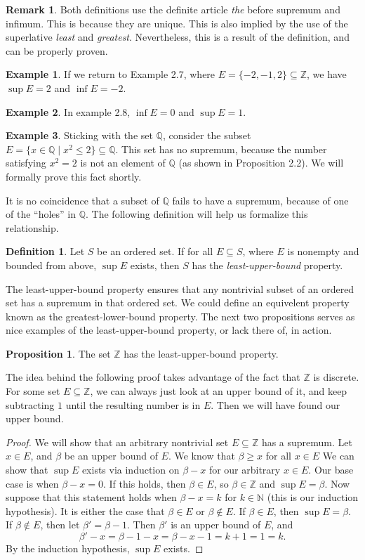 \documentclass{article}
\newcommand{\N}{\mathbb{N}}
\newcommand{\Q}{\mathbb{Q}}
\newcommand{\Z}{\mathbb{Z}}
\theoremstyle{definition}
\newtheorem{proposition}{Proposition}[section]
\newtheorem{definition}{Definition}[section]
\newtheorem{example}{Example}[section]
\newtheorem{remark}{Remark}[section]
\begin{document}
\begin{remark}
	Both definitions use the definite article \textit{the} before supremum and infimum. This is because they are unique. This is also implied by the use of the superlative \textit{least} and \textit{greatest}. Nevertheless, this is a result of the definition, and can be properly proven. 
\end{remark}

\begin{example}
	If we return to Example 2.7, where $ E=\{-2,-1,2\}\subseteq\Z $, we have $ \sup E=2 $ and $ \inf E=-2 $. 
\end{example}
\begin{example}
	In example 2.8, $ \inf E=0 $ and $ \sup E=1 $.
\end{example}
\begin{example}
	Sticking with the set $ \Q$, consider the subset $ E=\{x\in\Q\mid x^2\le 2\}\subseteq \Q $. This set has no supremum, because the number satisfying $ x^2=2 $ is not an element of $ \Q $ (as shown in Proposition 2.2). We will formally prove this fact shortly. 
\end{example}
It is no coincidence that a subset of $ \Q $ fails to have a supremum, because of one of the ``holes'' in $ \Q $. The following definition will help us formalize this relationship. 
\begin{definition}
	Let $ S $ be an ordered set. If for all $ E\subseteq S $, where $ E $ is nonempty and bounded from above, $ \sup E $ exists, then $ S $ has the \textit{\color{red}least-upper-bound} property. 
\end{definition}
The least-upper-bound property ensures that any nontrivial subset of an ordered set has a supremum in that ordered set. We could define an equivelent property known as the greatest-lower-bound property. The next two propositions serves as nice examples of the least-upper-bound property, or lack there of,  in action.
\begin{proposition}
	The set $ \Z $ has the least-upper-bound property.
\end{proposition}
The idea behind the following proof takes advantage of the fact that $ \Z $ is discrete. For some set $ E\subseteq \Z $, we can always just look at an upper bound of it, and keep subtracting $ 1 $ until the resulting number is in $ E $. Then we will have found our upper bound.
\begin{proof}
	We will show that an arbitrary nontrivial set $ E\subseteq \Z $ has a supremum. Let $ x\in E $, and $ \beta $ be an upper bound of $ E $. We know that $ \beta\ge x $ for all $ x\in E $ We can show that $ \sup E $ exists via induction on $ \beta-x $ for our arbitrary $ x\in E $. Our base case is when $ \beta-x=0 $. If this holds, then $ \beta\in E $, so $ \beta\in\Z $ and $ \sup E=\beta $. Now suppose that this statement holds when $ \beta-x=k $ for $ k\in\N $ (this is our induction hypothesis). It is either the case that $ \beta\in E $ or $ \beta\notin E $. If $ \beta\in E $, then $ \sup E=\beta $. If $ \beta \notin E $, then let $ \beta'=\beta -1 $. Then $ \beta' $ is an upper bound of $ E $, and $$\beta'-x=\beta-1-x=\beta-x-1=k+1=1=k .$$ By the induction hypothesis, $ \sup E $ exists.   
\end{proof}
\end{document}
